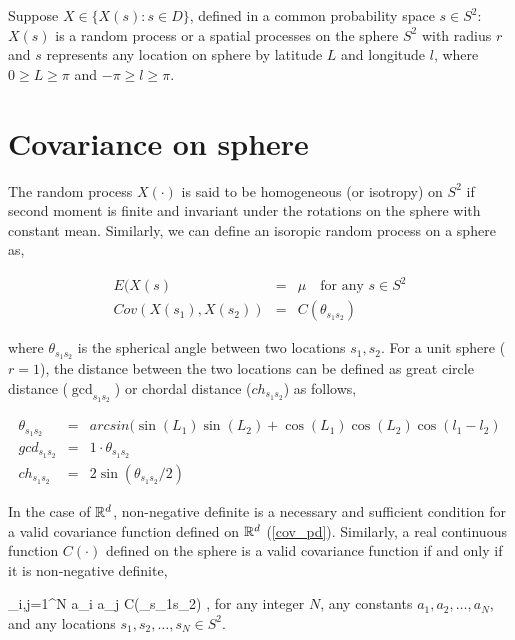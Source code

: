 

Suppose $X \in \{X(s): s\in D\}$, defined in a common probability space $s \in S^2$: $X(s)$ is a random process or a spatial processes on the sphere $S^2$ with radius $r$ and $s$ represents any location on sphere by latitude $L$ and longitude $l$, where $0 \ge L \ge \pi$ and $-\pi \ge l \ge \pi$.\\


\section{Covariance on sphere} 

The random process $X(\cdot)$ is said to be homogeneous (or isotropy) on $S^2$ if second moment is finite and invariant under the rotations on the sphere with constant mean. Similarly, we can define an isoropic random process on a sphere as, 

\begin{eqnarray*}
	E(X(s) &=& \mu \quad \mbox{for any } s\in S^2 \\
	Cov(X(s_1),X(s_2)) &=& C(\theta_{s_1s_2}) 
\end{eqnarray*}

where $\theta_{s_1s_2}$ is the spherical angle between two locations $s_1,s_2$. For a unit sphere ($r=1$), the distance between the two locations can be defined as great circle distance ($\gcd_{s_1s_2}$) or chordal distance ($ch_{s_1s_2}$) as follows,

\begin{eqnarray*}
	\theta_{s_1s_2}  &=& arcsin(\sin(L_1)\sin(L_2) + \cos(L_1)\cos(L_2)\cos(l_1-l_2)\\
	gcd_{s_1s_2}    &=&  1\cdot\theta_{s_1s_2}\\
	ch_{s_1s_2}     &=& 2\sin (\theta_{s_1s_2}/2)
\end{eqnarray*}

In the case of $\mathbb{R}^d$, non-negative definite is a necessary and sufficient condition for a valid covariance function defined on $\mathbb{R}^d$ (\ref{cov_pd}). Similarly, a real continuous function $C(\cdot)$ defined on the sphere is a valid covariance function if and only if it is non-negative definite,

\beq
\sum_{i,j=1}^{N} a_i a_j C(\theta_{s_1s_2}) ,
\eeq
for any integer $N$, any constants $a_1, a_2, \ldots, a_N$, and any locations $s_1, s_2, \ldots, s_N \in S^2$.

